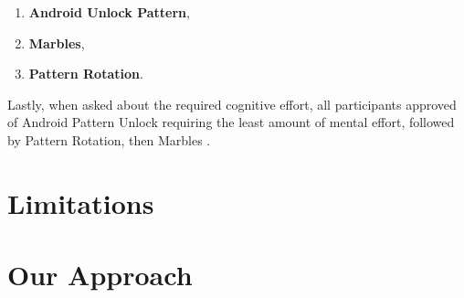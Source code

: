 \begin{enumerate}
     \item \textbf{Android Unlock Pattern},
    \item \textbf{Marbles},
    \item \textbf{Pattern Rotation}.
\end{enumerate}

Lastly, when asked about the required cognitive effort, all participants approved of Android Pattern Unlock requiring the least amount of mental effort, followed by Pattern Rotation, then Marbles \cite{anonymous}.

\section{Limitations}

\section{Our Approach}

